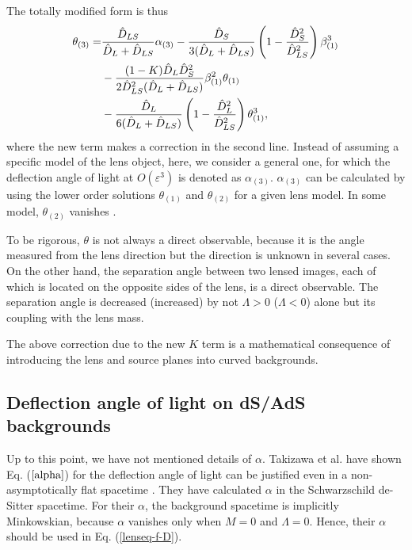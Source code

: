 \documentclass[twocolumn,showpacs,preprintnumbers,amsmath,amssymb]{revtex4-1}
\begin{document}
The totally modified form is thus 
\begin{align}
\theta_{(3)} 
=& 
\frac{\hat{D}_{LS}}{\hat{D}_L + \hat{D}_{LS}} 
\alpha_{(3)} 
-  
\frac{\hat{D}_S}{3 (\hat{D}_L + \hat{D}_{LS})}
\left(
1 - \frac{\hat{D}_S^2}{\hat{D}_{LS}^2} 
\right) 
\beta_{(1)}^3
\notag\\
&
- \frac{(1-K) \hat{D}_L\hat{D}_S^2 }{2 \hat{D}_{LS}^2(\hat{D}_L + \hat{D}_{LS})} 
\beta_{(1)}^2 \theta_{(1)} 
\notag\\
&
-  
\frac{\hat{D}_L}{6(\hat{D}_L + \hat{D}_{LS})}
\left(
1 - \frac{\hat{D}_L^2}{\hat{D}_{LS}^2} 
\right) 
\theta_{(1)}^3 ,
\label{theta-3}
\end{align}
where the new term makes a correction in the second line. 
Instead of assuming a specific model of the lens object, 
here, we consider a general one, for which the deflection angle of light 
at $O(\varepsilon^3)$ is denoted as $\alpha_{(3)}$. 
$\alpha_{(3)}$ can be calculated by using the lower order solutions 
$\theta_{(1)}$ and $\theta_{(2)}$ for a given lens model. 
In some model, $\theta_{(2)}$ vanishes \cite{Takizawa2020b}. 

To be rigorous, $\theta$ is not always a direct observable, 
because it is the angle measured from the lens direction 
but the direction is unknown in several cases. 
On the other hand, 
the separation angle between two lensed images, 
each of which is located on the opposite sides of the lens, 
is a direct observable. 
The separation angle is decreased (increased) by 
not $\Lambda > 0$ ($\Lambda < 0$) alone 
but its coupling with the lens mass. 

The above correction due to the new $K$ term is 
a mathematical consequence of introducing the lens and source planes 
into curved backgrounds. 


\subsection{Deflection angle of light on dS/AdS backgrounds}
Up to this point, we have not mentioned details of $\alpha$. 
Takizawa et al. have shown Eq. ($\ref{alpha}$) for the deflection angle of light 
can be justified even in a non-asymptotically flat spacetime \cite{Takizawa2020a}. 
They have calculated $\alpha$ in the Schwarzschild de-Sitter spacetime. 
For their $\alpha$, the background spacetime is implicitly Minkowskian, 
because $\alpha$ vanishes only when $M = 0$ and $\Lambda = 0$. 
Hence, their $\alpha$ should be used 
in Eq. (\ref{lenseq-f-D}). 
\end{document}
